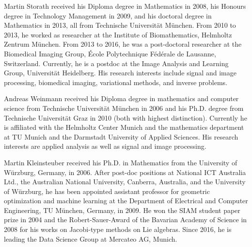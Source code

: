 \documentclass[journal]{IEEEtran}
\begin{document}
\begin{IEEEbiography}{Martin Storath}
received his Diploma degree in Mathematics  in 2008, his Honours degree in Technology Management in 2009, and his doctoral degree 
in Mathematics in 2013,
all from Technische Universit\"at M\"unchen.
From 2010 to 2013, he worked as researcher at the Institute of Biomathematics, Helmholtz Zentrum M\"unchen.
From 2013 to 2016, he was a post-doctoral researcher at the Biomedical Imaging Group, \'Ecole Polytechnique
F\'ed\'erale de Lausanne, Switzerland. 
Currently, he is a postdoc at the Image Analysis and Learning Group, Universit\"at Heidelberg.
His research interests include signal and image processing, biomedical imaging,
variational methods, and inverse problems.
\end{IEEEbiography}

\begin{IEEEbiography}{Andreas Weinmann}
	received his Diploma degree in mathematics and computer science from Technische Universit\"at M\"unchen in 2006
	and his Ph.D. degree from Technische Universit\"at Graz in 2010 (both with highest distinction).
	Currently he is affiliated with the Helmholtz Center Munich and the  
	mathematics department at TU Munich and the Darmstadt University of Applied Sciences.
	His research interests are applied analysis as well as signal and image processing.
\end{IEEEbiography}


\begin{IEEEbiography}{Martin Kleinsteuber}
received his Ph.D. in Mathematics from the University of Würzburg, Germany, in 2006. After post-doc positions at National ICT Australia Ltd., the Australian National University, Canberra, Australia, and the University of Würzburg, he has been appointed assistant professor for geometric optimization and machine learning at the Department of Electrical and Computer Engineering, TU München, Germany, in 2009. He won the SIAM student paper prize in 2004 and the Robert-Sauer-Award of the Bavarian Academy of Science in 2008 for his works on Jacobi-type methods on Lie algebras. Since 2016, he is leading the Data Science Group at Mercateo AG, Munich.
\end{IEEEbiography}



 
\end{document}
